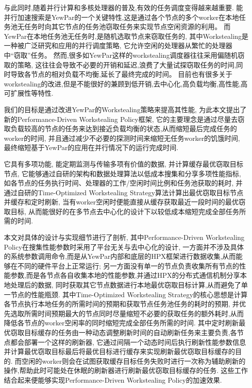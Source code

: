 \documentclass{mproj}
\begin{document}
与此同时,随着并行计算和多核处理器的普及,有效的任务调度变得越来越重要.
能并行加速搜索是YewPar的一个关键特性,这是通过各个节点的多个worker在本地任务池无任务时向其它节点的任务池窃取任务来实现节点空闲资源的利用。
而YewPar在本地任务池无任务时,是随机选取节点来窃取任务的,
其中Workstealing是一种被广泛研究和应用的并行调度策略,
它允许空闲的处理器从繁忙的处理器中“窃取”任务。
然而,很多如YewPar这样的workstealing调度器往往采用偏随机窃取的策略,
这往往会导致不必要的开销和延迟,浪费了大量试探窃取任务的时间,同时导致各节点的相对负载不均衡,延长了最终完成的时间。
目前也有很多关于workstealing的改进,但是不能很好的兼顾到低开销,去中心化,高负载均衡,高性能,高可扩展性等特性.

我们的目标是通过改进YewPar的Workstealing策略来提高其性能,
为此本文提出了新的Performance-Driven Workstealing Policy框架,
它的主要理念是通过尽量去窃取负载较高的节点的任务来达到接近负载均衡的状态,从而缩短最后完成任务的worker的时间,
并且通过减少不必要的探测时间来缩短无任务worker的饥饿时间,
最终缩短基于YewPar的应用在并行情况下的运行完成时间.

它具有多项功能,
能定期监测与传输多项有价值的数据,
并计算缓存最优窃取目标节点,
它能够通过自研的架构和数据处理算法以低成本搜集和分享多项性能指标,
如各节点的任务执行时间、处理器的工作/空闲时间比例和任务池获取的耗时,
并通过自研的Time-Optimized Workstealing Strategy算法计算出最优窃取目标节点并缓存和定时刷新,
当有worker空闲时便能直接从缓存获取最近一段时间的最优窃取目标,
从而能很好的在多节点去中心化的设计下以较低成本缩短完成全部任务所需的时间.

本文对具体的设计与实现细节进行了剖析,
其中Performance-Driven Workstealing Policy在搜集性能参数时采用了平台无关与去中心化的设计,
一方面并不涉及具体的系统参数调用命令,而是从YewPar内部和底层的HPX\cite{10.1145/2676870.2676883}框架进行数据收集,从而能够在不同的硬件平台上正常运行;
另一方面没有单一的节点负责收集所有节点的性能参数,而是各节点各自收集本地的性能参数,并通过HPX的分布式通信机制分享本地处理后的数据,
同时获取其它节点数据进行本地最优窃取目标计算,从而避免了单一节点的性能瓶颈.
其中Time-Optimized Workstealing Strategy的核心思想是计算各节点执行本地任务的所需时间的预期和获取节点任务池任务的耗时的预期,
并优先选取所需时间预期最大的节点同时尽量缩短不必要的获取任务的额外耗时,从而降低各节点的worker空闲率的同时缩短完成全部任务所需的时间.
其中定时刷新最优窃取目标缓存的任务由一种动态调整刷新时间的自动刷新任务来主要负责,各节点都会部署一个这样的刷新器,
它通过间隔一个动态时间后执行刷新性能参数信息并计算最优窃取目标最后将最优目标进行缓存来实现刷新最优窃取目标缓存的目的.
而空闲的worker则会在试图获取缓存目标任务失败时进行一次称为辅助刷新的操作,帮助此时可能处在休眠的刷新器进行刷新最优窃取目标缓存的任务.
这些工作结合起来便能够实现Performance-Driven Workstealing Policy的加速效果.
\end{document}

